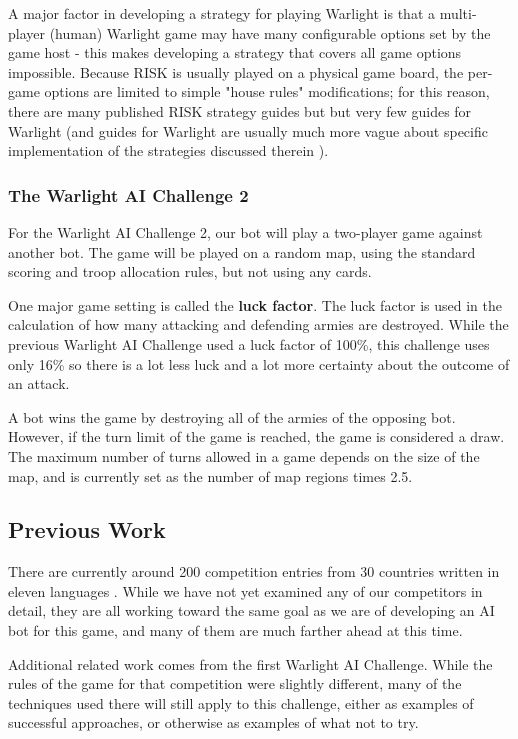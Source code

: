 \documentclass[a4paper,11pt]{article}
\begin{document}
A major factor in developing a strategy for playing Warlight is that a multi-player 
(human) Warlight game may have many configurable options set by the game host - 
this makes developing a strategy that covers all game options impossible. Because 
RISK is usually played on a physical game board, the per-game options are limited 
to simple "house rules" modifications; for this reason, there are many published 
RISK strategy guides but but very few guides for Warlight (and guides for Warlight 
are usually much more vague about specific implementation of the strategies 
discussed therein \cite{warlightguide}).

\subsubsection{The Warlight AI Challenge 2}
For the Warlight AI Challenge 2, our bot will play a two-player game against 
another bot.  The game will be played on a random map, using the standard scoring 
and troop allocation rules, but not using any cards.

One major game setting is called the \textbf{luck factor}. The luck factor is used 
in the calculation of how many attacking and defending armies are destroyed.  While 
the previous Warlight AI Challenge used a luck factor of 100\%, this challenge uses 
only 16\% so there is a lot less luck and a lot more certainty about the outcome of 
an attack.

A bot wins the game by destroying all of the armies of the opposing bot.  However, 
if the turn limit of the game is reached, the game is considered a draw.  The 
maximum number of turns allowed in a game depends on the size of the map, and is 
currently set as the number of map regions times 2.5.

\subsection{Previous Work}\label{sec:previous}

There are currently around 200 competition entries from 30 countries written in 
eleven languages \cite{warlight}.  While we have not yet examined any of our competitors in detail, 
they are all working toward the same goal as we are of developing an AI bot for 
this game, and many of them are much farther ahead at this time.

Additional related work comes from the first Warlight AI Challenge.  While the 
rules of the game for that competition were slightly different, many of the 
techniques used there will still apply to this challenge, either as examples of 
successful approaches, or otherwise as examples of what not to try.
\end{document}
